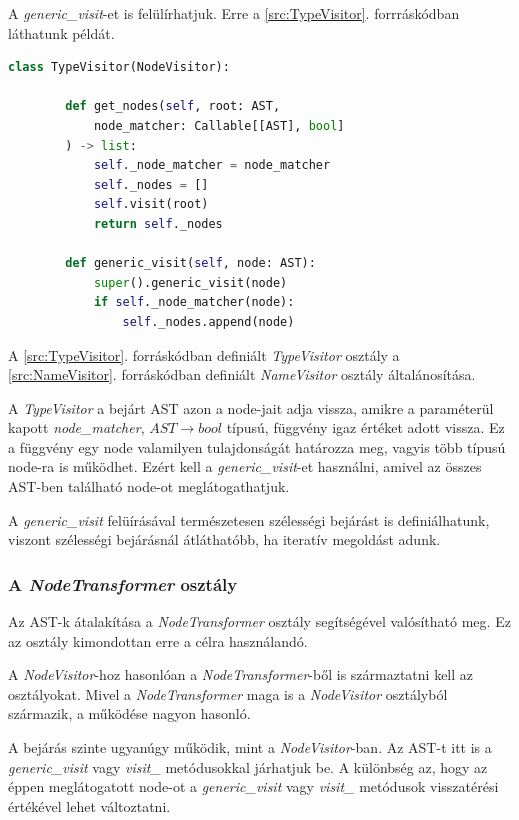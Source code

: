 A \emph{generic\_visit}-et is felülírhatjuk.
Erre a \ref{src:TypeVisitor}. forrráskódban láthatunk példát.

\begin{lstlisting}[language={Python}]
	class TypeVisitor(NodeVisitor):
		
		def get_nodes(self, root: AST,
			node_matcher: Callable[[AST], bool]
		) -> list:
			self._node_matcher = node_matcher
			self._nodes = []
			self.visit(root)
			return self._nodes
		
		def generic_visit(self, node: AST):
			super().generic_visit(node)
			if self._node_matcher(node):
				self._nodes.append(node)
\end{lstlisting}


A \ref{src:TypeVisitor}. forráskódban definiált \emph{TypeVisitor} osztály
a \ref{src:NameVisitor}. forráskódban definiált \emph{NameVisitor} osztály
általánosítása.

A \emph{TypeVisitor} a bejárt AST azon a node-jait adja vissza,
amikre a paraméterül kapott \emph{node\_matcher}, $AST \rightarrow bool$ típusú,
függvény igaz értéket adott vissza.
Ez a függvény egy node valamilyen tulajdonságát határozza meg,
vagyis több típusú node-ra is működhet.
Ezért kell a \emph{generic\_visit}-et használni,
amivel az összes AST-ben található node-ot meglátogathatjuk.

A \emph{generic\_visit} felüírásával természetesen szélességi bejárást is definiálhatunk,
viszont szélességi bejárásnál átláthatóbb, ha iteratív megoldást adunk.

\subsubsection{A \emph{NodeTransformer} osztály}

Az AST-k átalakítása a \emph{NodeTransformer} osztály segítségével valósítható meg.
Ez az osztály kimondottan erre a célra használandó.

A \emph{NodeVisitor}-hoz hasonlóan a \emph{NodeTransformer}-ből is származtatni
kell az osztályokat.
Mivel a \emph{NodeTransformer} maga is a \emph{NodeVisitor} osztályból származik,
a működése nagyon hasonló.

A bejárás szinte ugyanúgy működik, mint a \emph{NodeVisitor}-ban.
Az AST-t itt is a \emph{generic\_visit} vagy \emph{visit\_<node-class>} metódusokkal
járhatjuk be.
A különbség az, hogy az éppen meglátogatott node-ot a
\emph{generic\_visit} vagy \emph{visit\_<node-class>}
metódusok visszatérési értékével lehet változtatni. 

